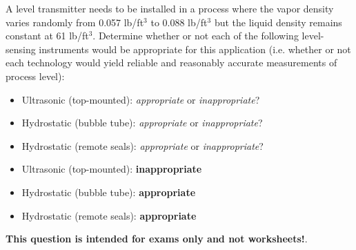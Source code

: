 

A level transmitter needs to be installed in a process where the vapor density varies randomly from 0.057 lb/ft$^{3}$ to 0.088 lb/ft$^{3}$ but the liquid density remains constant at 61 lb/ft$^{3}$.  Determine whether or not each of the following level-sensing instruments would be appropriate for this application (i.e. whether or not each technology would yield reliable and reasonably accurate measurements of process level):

\begin{itemize}
\item{} Ultrasonic (top-mounted): {\it appropriate} or {\it inappropriate}?
\vskip 10pt
\item{} Hydrostatic (bubble tube): {\it appropriate} or {\it inappropriate}?
\vskip 10pt
\item{} Hydrostatic (remote seals): {\it appropriate} or {\it inappropriate}?
\end{itemize}







\begin{itemize}
\item{} Ultrasonic (top-mounted): {\bf inappropriate}
\vskip 10pt
\item{} Hydrostatic (bubble tube): {\bf appropriate}
\vskip 10pt
\item{} Hydrostatic (remote seals): {\bf appropriate}
\end{itemize}







{\bf This question is intended for exams only and not worksheets!}.



